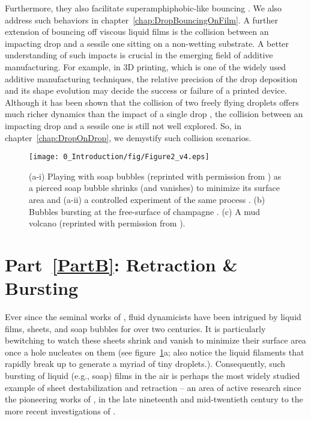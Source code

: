 Furthermore, they also facilitate superamphiphobic-like bouncing \citep{kolinski2014drops}. We also address such behaviors in chapter~\ref{chap:DropBouncingOnFilm}. A further extension of bouncing off viscous liquid films is the collision between an impacting drop and a sessile one sitting on a non-wetting substrate. A better understanding of such impacts is crucial in the emerging field of additive manufacturing. For example, in 3D printing, which is one of the widely used additive manufacturing techniques, the relative precision of the drop deposition and its shape evolution may decide the success or failure of a printed device. Although it has been shown that the collision of two freely flying droplets offers much richer dynamics than the impact of a single drop \citep{jiang1992, qian1997}, the collision between an impacting drop and a sessile one is still not well explored. So, in chapter~\ref{chap:DropOnDrop}, we demystify such collision scenarios.

\begin{figure}
	\centering
	\texttt{[image: 0\_Introduction/fig/Figure2\_v4.eps]}
	\caption{(a-i) Playing with soap bubbles (reprinted with permission from \citet{guyon2021hidden}) as a pierced soap bubble shrinks (and vanishes) to minimize its surface area and (a-ii) a controlled experiment of the same process \citep{lhuissier2012bursting}. (b) Bubbles bursting at the free-surface of champagne \citep{ghabache2016evaporation}. (c) A mud volcano (reprinted with permission from \citet{balmforth2014yielding}).}
	\label{Ch0::Fig2}
\end{figure}

\section*{Part~\ref{PartB}: Retraction \& Bursting}
Ever since the seminal works of \citet{savart1833oppositejets, savart1833waterbells, savart1833hydraulicjump}, fluid dynamicists have been intrigued by liquid films, sheets, and soap bubbles for over two centuries. It is particularly bewitching to watch these sheets shrink and vanish to minimize their surface area once a hole nucleates on them (see figure~\ref{Ch0::Fig2}a; also notice the liquid filaments that rapidly break up to generate a myriad of tiny droplets.). Consequently, such bursting of liquid (e.g., soap) films in the air is perhaps the most widely studied example of sheet destabilization and retraction -- an area of active research since the pioneering works of \citet{dupre1867theorie, dupre1869theorie, rayleigh-1891-nature}, \citet{taylor-1959-procrsoclonda, culick-1960-japplphys, mcentee-1969-jphyschem} in the late nineteenth and mid-twentieth century to the more recent investigations of \citet{bremond-2005-jfm, muller-2007-prl, lhuissier2012bursting, munro-2015-jfm, deka2020revisiting}.

